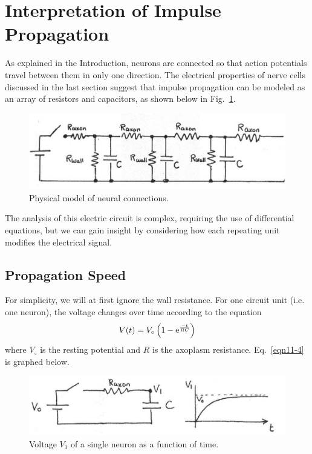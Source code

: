 \section{Interpretation of Impulse Propagation} 

As explained in the Introduction, neurons are connected so that action potentials travel between them in only one direction.  The electrical properties of nerve cells discussed in the last section suggest that impulse propagation can be modeled as an array of resistors and capacitors, as shown below in Fig.~\ref{Fig11-11}.
\begin{figure}[!htb]
	\centering
	\includegraphics[width=4.5in]{./figures/Topic11/Fig11-11.jpg}
	\caption{Physical model of neural connections.}
	\label{Fig11-11}
\end{figure}
The analysis of this electric circuit is complex, requiring the use of differential equations, but we can gain insight by considering how each repeating unit modifies the electrical signal.

\subsection{Propagation Speed}

For simplicity, we will at first ignore the wall resistance.  For one circuit unit (i.e. one neuron), the voltage changes over time according to the equation
\begin{equation}\label{eqn11-4}
V(t)=V_{\circ}\left(1-{\rm e}^{\frac{-t}{RC}}\right)
\end{equation}
where $V_{\circ}$ is the resting potential and $R$ is the axoplasm resistance.  Eq.~\ref{eqn11-4} is graphed below.
\begin{figure}[!htb]
	\centering
	\includegraphics[width=4.5in]{./figures/Topic11/Fig11-12.jpg}
	\caption{Voltage $V_1$ of a single neuron as a function of time.}
	\label{Fig11-12}
\end{figure}  

